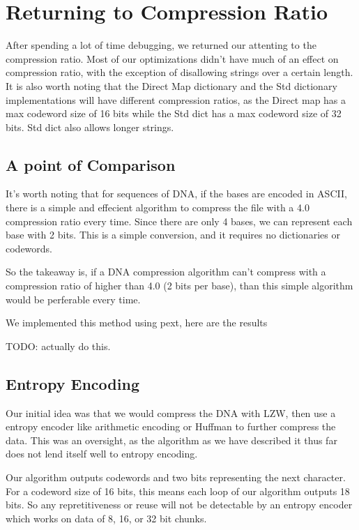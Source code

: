 \documentclass[12pt,twoside]{reedthesis}
\begin{document}
\hypertarget{returning-to-compression-ratio}{%
\section{Returning to Compression Ratio}\label{returning-to-compression-ratio}}

After spending a lot of time debugging, we returned our attenting to the compression ratio. Most of our optimizations didn't have much of an effect on compression ratio, with the exception of disallowing strings over a certain length. It is also worth noting that the Direct Map dictionary and the Std dictionary implementations will have different compression ratios, as the Direct map has a max codeword size of 16 bits while the Std dict has a max codeword size of 32 bits. Std dict also allows longer strings.

\hypertarget{a-point-of-comparison}{%
\subsection{A point of Comparison}\label{a-point-of-comparison}}

It's worth noting that for sequences of DNA, if the bases are encoded in ASCII, there is a simple and effecient algorithm to compress the file with a 4.0 compression ratio every time. Since there are only 4 bases, we can represent each base with 2 bits. This is a simple conversion, and it requires no dictionaries or codewords.

So the takeaway is, if a DNA compression algorithm can't compress with a compression ratio of higher than 4.0 (2 bits per base), than this simple algorithm would be perferable every time.

We implemented this method using pext, here are the results

TODO: actually do this.

\hypertarget{entropy-encoding}{%
\subsection{Entropy Encoding}\label{entropy-encoding}}

Our initial idea was that we would compress the DNA with LZW, then use a entropy encoder like arithmetic encoding or Huffman to further compress the data. This was an oversight, as the algorithm as we have described it thus far does not lend itself well to entropy encoding.

Our algorithm outputs codewords and two bits representing the next character. For a codeword size of 16 bits, this means each loop of our algorithm outputs 18 bits. So any repretitiveness or reuse will not be detectable by an entropy encoder which works on data of 8, 16, or 32 bit chunks.
\end{document}
